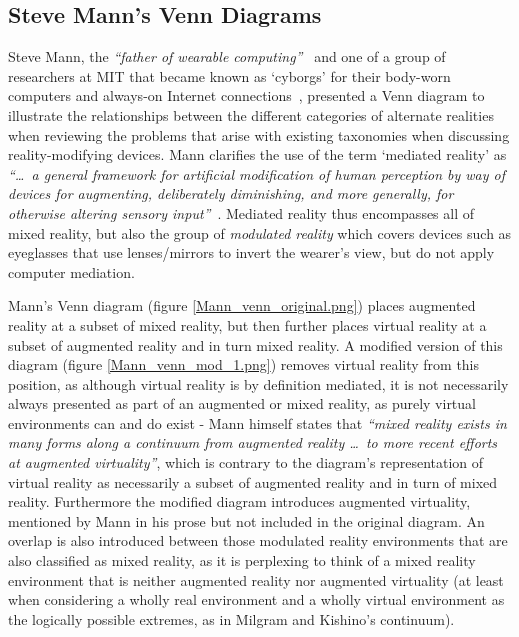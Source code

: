 \subsection{Steve Mann's Venn Diagrams}
\label{stevemannvenn}
Steve Mann, the \textit{``father of wearable computing''}~\cite{Schofield2012} and one of a group of researchers at MIT that became known as `cyborgs' for their body-worn computers and always-on Internet connections~\cite{Turkle2011}, presented a Venn diagram to illustrate the relationships between the different categories of alternate realities when reviewing the problems that arise with existing taxonomies when discussing reality-modifying devices. Mann clarifies the use of the term `mediated reality' as \textit{``\ldots\ a general framework for artificial modification of human perception by way of devices for augmenting, deliberately diminishing, and more generally, for otherwise altering sensory input''}~\cite{Mann2002a}. Mediated reality thus encompasses all of mixed reality, but also the group of \textit{modulated reality} which covers devices such as eyeglasses that use lenses/mirrors to invert the wearer's view, but do not apply computer mediation.


Mann's Venn diagram (figure \ref{Mann_venn_original.png}) places augmented reality at a subset of mixed reality, but then further places virtual reality at a subset of augmented reality and in turn mixed reality. A modified version of this diagram (figure \ref{Mann_venn_mod_1.png}) removes virtual reality from this position, as although virtual reality is by definition mediated, it is not necessarily always presented as part of an augmented or mixed reality, as purely virtual environments can and do exist - Mann himself states that \textit{``mixed reality exists in many forms along a continuum from augmented reality \ldots\ to more recent efforts at augmented virtuality''}, which is contrary to the diagram's representation of virtual reality as necessarily a subset of augmented reality and in turn of mixed reality. Furthermore the modified diagram introduces augmented virtuality, mentioned by Mann in his prose but not included in the original diagram. An overlap is also introduced between those modulated reality environments that are also classified as mixed reality, as it is perplexing to think of a mixed reality environment that is neither augmented reality nor augmented virtuality (at least when considering a wholly real environment and a wholly virtual environment as the logically possible extremes, as in Milgram and Kishino's continuum).

